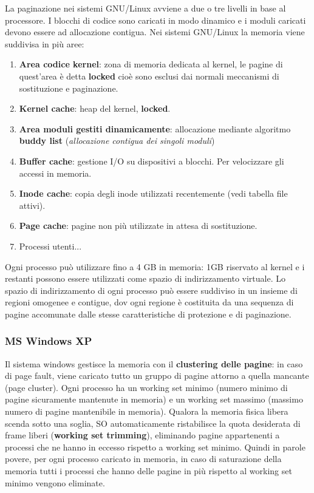 \documentclass{article}
\begin{document}
\noindent La paginazione nei sistemi GNU/Linux avviene a due o tre livelli in base al processore. I blocchi di codice sono caricati in modo dinamico e i moduli caricati devono essere
ad allocazione contigua. Nei sistemi GNU/Linux la memoria viene suddivisa in più aree:
\begin{enumerate}
    \item \textbf{Area codice kernel}: zona di memoria dedicata al kernel, le pagine di quest'area è detta \textbf{locked} cioè sono esclusi dai normali meccanismi di sostituzione
    e paginazione.
    \item \textbf{Kernel cache}: heap del kernel, \textbf{locked}.
    \item \textbf{Area moduli gestiti dinamicamente}: allocazione mediante algoritmo \textbf{buddy list} (\textit{allocazione contigua dei singoli moduli})
    \item \textbf{Buffer cache}: gestione I/O su dispositivi a blocchi. Per velocizzare gli accessi in memoria.
    \item \textbf{Inode cache}: copia degli inode utilizzati recentemente  (vedi tabella file attivi).
    \item \textbf{Page cache}: pagine non più utilizzate in attesa di sostituzione.
    \item Processi utenti...
\end{enumerate}

\noindent Ogni processo può utilizzare fino a 4 GB in memoria: 1GB riservato al kernel e i restanti possono essere utilizzati come spazio di indirizzamento virtuale.
Lo spazio di indirizzamento di ogni processo può essere suddiviso in un insieme di regioni omogenee e contigue, dov ogni regione è costituita da una sequenza di pagine
accomunate dalle stesse caratteristiche di protezione e di paginazione.

\subsubsection{MS Windows XP}
\noindent Il sistema windows gestisce la memoria con il \textbf{clustering delle pagine}: in caso di page fault, viene caricato tutto un gruppo di pagine attorno a quella
 mancante (page cluster). Ogni processo ha un working set minimo (numero minimo di pagine sicuramente mantenute in memoria) e un working set massimo (massimo numero di
pagine mantenibile in memoria). Qualora la memoria fisica libera scenda sotto una soglia, SO automaticamente ristabilisce la quota desiderata di frame liberi
 (\textbf{working set trimming}), eliminando pagine appartenenti a processi che ne hanno in eccesso rispetto a working set minimo. Quindi in parole povere, per ogni processo
 caricato in memoria, in caso di saturazione della memoria tutti i processi che hanno delle pagine in più rispetto al working set minimo vengono eliminate.
\end{document}
